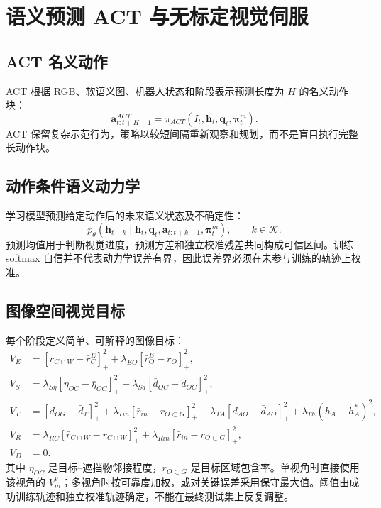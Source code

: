 \documentclass[UTF8,a4paper,11pt]{ctexart}
\newcommand{\pos}[1]{\left[#1\right]_{+}}
\begin{document}
\section{语义预测 ACT 与无标定视觉伺服}

\subsection{ACT 名义动作}

ACT 根据 RGB、软语义图、机器人状态和阶段表示预测长度为 $H$ 的名义动作块\cite{zhao2023act}：
\begin{equation}
\bm a_{t:t+H-1}^{ACT}=\pi_{ACT}(I_t,\bm h_t,\bm q_t,\bm\pi_t^m).
\end{equation}
ACT 保留复杂示范行为，策略以较短间隔重新观察和规划，而不是盲目执行完整长动作块。

\subsection{动作条件语义动力学}

学习模型预测给定动作后的未来语义状态及不确定性：
\begin{equation}
p_\theta\left(
\bm h_{t+k}\mid \bm h_t,\bm q_t,
\bm a_{t:t+k-1},\bm\pi_t^m
\right),\qquad k\in\mathcal K.
\end{equation}
预测均值用于判断视觉进度，预测方差和独立校准残差共同构成可信区间。训练 softmax 自信并不代表动力学误差有界，因此误差界必须在未参与训练的轨迹上校准。

\subsection{图像空间视觉目标}

每个阶段定义简单、可解释的图像目标：
\begin{align}
V_E &= \pos{r_{C\cap W}-\bar r_C^E}^2
       +\lambda_{EO}\pos{\bar r_O^E-r_O}^2,\\
V_S &= \lambda_{S\eta}\pos{\eta_{OC}-\bar\eta_{OC}}^2
       +\lambda_{Sd}\pos{\bar d_{OC}-d_{OC}}^2,\\
V_T &= \pos{d_{OG}-\bar d_T}^2
       +\lambda_{Tin}\pos{\bar r_{in}-r_{O\subset G}}^2
       +\lambda_{TA}\pos{d_{AO}-\bar d_{AO}}^2
       +\lambda_{Th}(h_A-h_A^*)^2,\\
V_R &= \lambda_{RC}\pos{\bar r_{C\cap W}-r_{C\cap W}}^2
       +\lambda_{Rin}\pos{\bar r_{in}-r_{O\subset G}}^2,\\
V_D &= 0.
\end{align}
其中 $\eta_{OC}$ 是目标--遮挡物邻接程度，$r_{O\subset G}$ 是目标区域包含率。单视角时直接使用该视角的 $V_m^v$；多视角时按可靠度加权，或对关键误差采用保守最大值。阈值由成功训练轨迹和独立校准轨迹确定，不能在最终测试集上反复调整。
\end{document}

